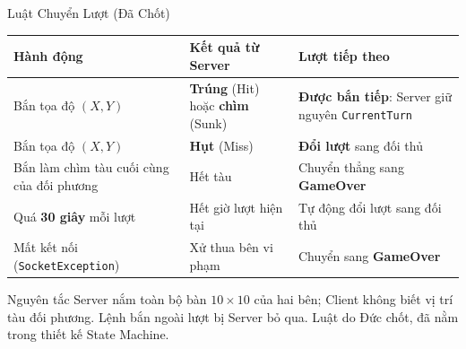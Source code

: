 \begin{frame}{Luật Chuyển Lượt (Đã Chốt)}
  \footnotesize
  \begin{tabularx}{\textwidth}{@{}l l Y@{}}
    \toprule \textbf{Hành động} & \textbf{Kết quả từ Server} & \textbf{Lượt tiếp theo} \\ \midrule
    Bắn tọa độ $(X,Y)$ & \textbf{Trúng} (Hit) hoặc \textbf{chìm} (Sunk) & \textbf{Được bắn tiếp}: Server giữ nguyên \texttt{CurrentTurn} \\
    Bắn tọa độ $(X,Y)$ & \textbf{Hụt} (Miss) & \textbf{Đổi lượt} sang đối thủ \\
    Bắn làm chìm tàu cuối cùng của đối phương & Hết tàu & Chuyển thẳng sang \textbf{GameOver} \\
    Quá \textbf{30 giây} mỗi lượt & Hết giờ lượt hiện tại & Tự động đổi lượt sang đối thủ \\
    Mất kết nối (\texttt{SocketException}) & Xử thua bên vi phạm & Chuyển sang \textbf{GameOver} \\
    \bottomrule
  \end{tabularx}
  \vspace{0.2cm}
  \begin{alertblock}{Nguyên tắc}
    \scriptsize Server nắm toàn bộ bàn $10\times10$ của hai bên; Client không biết vị trí tàu đối phương. Lệnh bắn ngoài lượt bị Server bỏ qua. Luật do Đức chốt, đã nằm trong thiết kế State Machine.
  \end{alertblock}
\end{frame}

